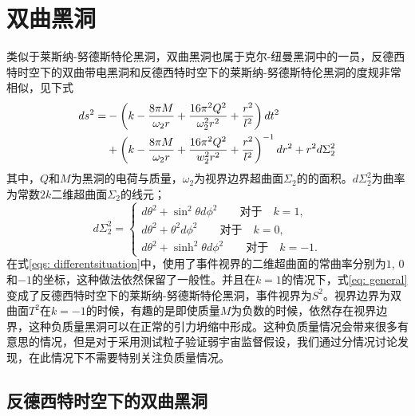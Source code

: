 \section{双曲黑洞}
类似于莱斯纳-努德斯特伦黑洞，双曲黑洞也属于克尔-纽曼黑洞中的一员，反德西特时空下的双曲带电黑洞和反德西特时空下的莱斯纳-努德斯特伦黑洞的度规非常相似，见下式\citep{cai1999topological}
\begin{align}\label{eq: general}
    ds^2=&-\left(k-\frac{8\pi M}{\omega_2 r}+\frac{16 \pi^2 Q^2}{\omega_2^2r^2}+\frac{r^2}{l^2}\right)dt^2 \notag \\
    &+\left(k-\frac{8\pi M}{\omega_2 r}+\frac{16\pi^2 Q^2}{w_2^2 r^2}+\frac{r^2}{l^2}\right)^{-1}dr^2+r^2d\Sigma_2^2
\end{align}
其中，$Q$和$M$为黑洞的电荷与质量，$\omega_2$为视界边界超曲面$\Sigma_2$的的面积。$d\Sigma_2^2$为曲率为常数$2k$二维超曲面$\Sigma_2$的线元；
\begin{equation}\label{eqs: differentsituation}
    d\Sigma^2_2=\begin{cases}
        d\theta^2+\sin ^2 \theta d\phi^2 \qquad \text{对于} \quad k=1, \\
        d\theta^2+ \theta^2 d\phi^2 \qquad \text{对于} \quad k=0, \\
        d\theta^2+\sinh ^2 \theta d\phi^2 \qquad \text{对于} \quad k=-1.
    \end{cases}
\end{equation}
在式\eqref{eqs: differentsituation}中，使用了事件视界的二维超曲面的常曲率分别为$1$, $0$和$-1$的坐标，这种做法依然保留了一般性。并且在$k=1$的情况下，式\eqref{eq: general}变成了反德西特时空下的莱斯纳-努德斯特伦黑洞，事件视界为$S^2$。视界边界为双曲面$T^2$在$k=-1$的时候，有趣的是即使质量$M$为负数的时候，依然存在视界边界，这种负质量黑洞可以在正常的引力坍缩中形成\citep{mann1997black,smith1997formation}。这种负质量情况会带来很多有意思的情况，但是对于采用测试粒子验证弱宇宙监督假设，我们通过分情况讨论发现，在此情况下不需要特别关注负质量情况。

\subsection{反德西特时空下的双曲黑洞}

